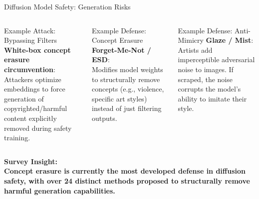 \begin{frame}{Diffusion Model Safety: Generation Risks}
  \begin{columns}[T]
    \begin{ucrcard}[UCRnavy]{Example Attack: Bypassing Filters}
      \scriptsize
      \textbf{White-box concept erasure circumvention}:\\
      Attackers optimize embeddings to force generation of copyrighted/harmful content explicitly removed during safety training.
    \end{ucrcard}

    \begin{ucrcard}[UCRnavy]{Example Defense: Concept Erasure}
      \scriptsize
      \textbf{Forget-Me-Not / ESD}:\\
      Modifies model weights to structurally remove concepts (e.g., violence, specific art styles) instead of just filtering outputs.
    \end{ucrcard}

    \vspace{0.3em}
    \begin{ucrcard}[UCRnavy]{Example Defense: Anti-Mimicry}
      \scriptsize
      \textbf{Glaze / Mist}:\\
      Artists add imperceptible adversarial noise to images. If scraped, the noise corrupts the model's ability to imitate their style.
    \end{ucrcard}
  \end{columns}

  \vspace{0.3em}
  \begin{ucrinfo}
    \centering\scriptsize\bfseries Survey Insight:\\[2pt]
    \normalfont\scriptsize
    Concept erasure is currently the most developed defense in diffusion safety, with over \textbf{24 distinct methods} proposed to structurally remove harmful generation capabilities.
  \end{ucrinfo}
\end{frame}


